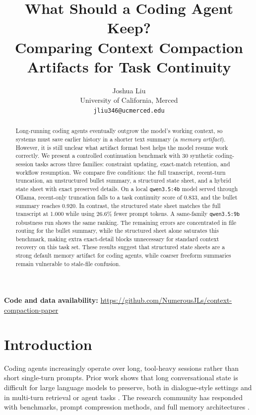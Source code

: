 \documentclass[11pt]{article}
\title{What Should a Coding Agent Keep?\\Comparing Context Compaction Artifacts for Task Continuity}
\author{Joshua Liu \\
  University of California, Merced \\
  \texttt{jliu346@ucmerced.edu}}
\begin{document}
\maketitle

\begin{abstract}
Long-running coding agents eventually outgrow the model's working context, so systems must save earlier history in a shorter text summary (a \emph{memory artifact}). However, it is still unclear what artifact format best helps the model resume work correctly. We present a controlled continuation benchmark with 30 synthetic coding-session tasks across three families: constraint updating, exact-match retention, and workflow resumption. We compare five conditions: the full transcript, recent-turn truncation, an unstructured bullet summary, a structured state sheet, and a hybrid state sheet with exact preserved details. On a local \texttt{qwen3.5:4b} model served through Ollama, recent-only truncation falls to a task continuity score of 0.833, and the bullet summary reaches 0.920. In contrast, the structured state sheet matches the full transcript at 1.000 while using 26.6\% fewer prompt tokens. A same-family \texttt{qwen3.5:9b} robustness run shows the same ranking. The remaining errors are concentrated in file routing for the bullet summary, while the structured sheet alone saturates this benchmark, making extra exact-detail blocks unnecessary for standard context recovery on this task set. These results suggest that structured state sheets are a strong default memory artifact for coding agents, while coarser freeform summaries remain vulnerable to stale-file confusion.
\end{abstract}

{\raggedright
\noindent\textbf{Code and data availability:} \url{https://github.com/NumerousJLs/context-compaction-paper}\par
}

\section{Introduction}
Coding agents increasingly operate over long, tool-heavy sessions rather than short single-turn prompts. Prior work shows that long conversational state is difficult for large language models to preserve, both in dialogue-style settings and in multi-turn retrieval or agent tasks \citep{maharana-etal-2024-evaluating, jia-etal-2025-evaluating, katsis-etal-2025-mt}. The research community has responded with benchmarks, prompt compression methods, and full memory architectures \citep{chuang-etal-2024-learning, jeong-etal-2025-ecorag, kang-etal-2025-memory, hu-etal-2025-hiagent, sun-etal-2026-h}.
\end{document}
